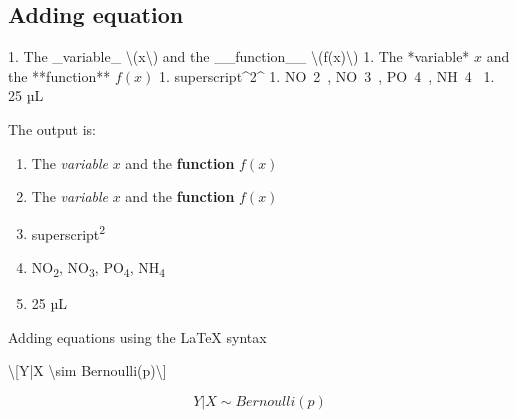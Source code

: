 \documentclass[review]{elsarticle} %
\providecommand{\tightlist}{%
  \setlength{\itemsep}{0pt}\setlength{\parskip}{0pt}}
\newenvironment{Shaded}{\begin{snugshade}}{\end{snugshade}}
\newcommand{\FloatTok}[1]{\textcolor[rgb]{0.00,0.00,0.81}{#1}}
\newcommand{\SpecialCharTok}[1]{\textcolor[rgb]{0.00,0.00,0.00}{#1}}
\newcommand{\SpecialStringTok}[1]{\textcolor[rgb]{0.31,0.60,0.02}{#1}}
\newcommand{\NormalTok}[1]{#1}
\begin{document}
\subsection{Adding equation}\label{equation}

\begin{Shaded}
\begin{Highlighting}[]
\NormalTok{1. }\FloatTok{The _variable_ \textbackslash{}(x\textbackslash{}) and the __function__ \textbackslash{}(f(x)\textbackslash{})}
\FloatTok{1. The *variable* $x$ and the **function** $f(x)$}
\FloatTok{1. superscript^2^}
\FloatTok{1. NO~2~, NO~3~, PO~4~, NH~4~}
\FloatTok{1. 25 µL}
\end{Highlighting}
\end{Shaded}

The output is:

\begin{enumerate}
\def\labelenumi{\arabic{enumi}.}
\tightlist
\item
  The \emph{variable} \(x\) and the \textbf{function} \(f(x)\)
\item
  The \emph{variable} \(x\) and the \textbf{function} \(f(x)\)
\item
  superscript\textsuperscript{2}
\item
  NO\textsubscript{2}, NO\textsubscript{3}, PO\textsubscript{4},
  NH\textsubscript{4}
\item
  25 µL
\end{enumerate}

Adding equations using the LaTeX syntax

\begin{Shaded}
\begin{Highlighting}[]
\SpecialStringTok{\textbackslash{}[Y|X }\SpecialCharTok{\textbackslash{}sim}\SpecialStringTok{ Bernoulli(p)\textbackslash{}]}
\end{Highlighting}
\end{Shaded}

\[Y|X \sim Bernoulli(p)\]
\end{document}
